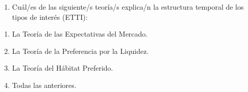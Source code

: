 \documentclass[
  letterpaper,
  DIV=11,
  numbers=noendperiod]{scrreprt}
\providecommand{\tightlist}{%
  \setlength{\itemsep}{0pt}\setlength{\parskip}{0pt}}\usepackage{longtable,booktabs,array}
\begin{document}
\begin{enumerate}
\def\labelenumi{\arabic{enumi}.}
\setcounter{enumi}{28}
\tightlist
\item
  Cuál/es de las siguiente/s teoría/s explica/n la estructura temporal
  de los tipos de interés (ETTI):
\end{enumerate}

\begin{enumerate}
\def\labelenumi{\alph{enumi}.}
\item
  La Teoría de las Expectativas del Mercado.
\item
  La Teoría de la Preferencia por la Liquidez.
\item
  La Teoría del Hábitat Preferido.
\item
  Todas las anteriores.
\end{enumerate}
\end{document}
